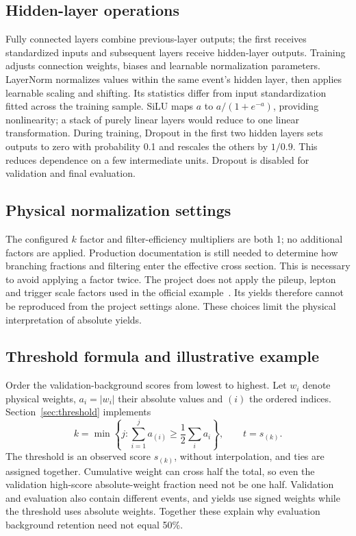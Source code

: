 \documentclass[11pt,a4paper]{article}
\begin{document}
\subsection{Hidden-layer operations}\label{app:layers}
Fully connected layers combine previous-layer outputs; the first receives standardized inputs and subsequent layers receive hidden-layer outputs.
Training adjusts connection weights, biases and learnable normalization parameters.
LayerNorm normalizes values within the same event's hidden layer, then applies learnable scaling and shifting.
Its statistics differ from input standardization fitted across the training sample.
SiLU maps $a$ to $a/(1+e^{-a})$, providing nonlinearity; a stack of purely linear layers would reduce to one linear transformation.
During training, Dropout in the first two hidden layers sets outputs to zero with probability 0.1 and rescales the others by $1/0.9$. This reduces dependence on a few intermediate units.
Dropout is disabled for validation and final evaluation.

\subsection{Physical normalization settings}\label{app:normalization}
The configured $k$ factor and filter-efficiency multipliers are both 1; no additional factors are applied.
Production documentation is still needed to determine how branching fractions and filtering enter the effective cross section. This is necessary to avoid applying a factor twice.
The project does not apply the pileup, lepton and trigger scale factors used in the official example~\cite{HZZAnalysis}. Its yields therefore cannot be reproduced from the project settings alone.
These choices limit the physical interpretation of absolute yields.

\subsection{Threshold formula and illustrative example}\label{app:threshold}
Order the validation-background scores from lowest to highest. Let $w_i$ denote physical weights, $a_i=|w_i|$ their absolute values and $(i)$ the ordered indices.
Section~\ref{sec:threshold} implements
\[
 k=\min\left\{j:\sum_{i=1}^{j}a_{(i)}\geq\frac12\sum_i a_i\right\},
 \qquad t=s_{(k)}.
\]
The threshold is an observed score $s_{(k)}$, without interpolation, and ties are assigned together.
Cumulative weight can cross half the total, so even the validation high-score absolute-weight fraction need not be one half.
Validation and evaluation also contain different events, and yields use signed weights while the threshold uses absolute weights.
Together these explain why evaluation background retention need not equal 50\%.
\end{document}
